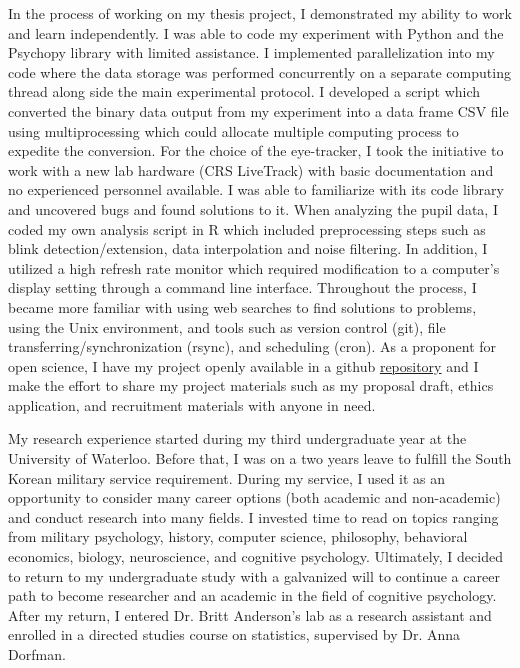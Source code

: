 \documentclass[12pt]{article}
\begin{document}
In the process of working on my thesis project, I demonstrated my ability to work and learn independently. I was able to code my experiment with Python and the Psychopy library with limited assistance. I implemented parallelization into my code where the data storage was performed concurrently on a separate computing thread along side the main experimental protocol. I developed a script which converted the binary data output from my experiment into a data frame CSV file using multiprocessing which could allocate multiple computing process to expedite the conversion. For the choice of the eye-tracker, I took the initiative to work with a new lab hardware (CRS LiveTrack) with basic documentation and no experienced personnel available. I was able to familiarize with its code library and uncovered bugs and found solutions to it. When analyzing the pupil data, I coded my own analysis script in R which included preprocessing steps such as blink detection/extension, data interpolation and noise filtering. In addition, I utilized a high refresh rate monitor which required modification to a computer’s display setting through a command line interface. Throughout the process, I became more familiar with using web searches to find solutions to problems, using the Unix environment, and tools such as version control (git), file transferring/synchronization (rsync), and scheduling (cron). As a proponent for open science, I have my project openly available in a github \href{https://github.com/sjp117/Undergrad_Projects}{repository} and I make the effort to share my project materials such as my proposal draft, ethics application, and recruitment materials with anyone in need.

My research experience started during my third undergraduate year at the University of Waterloo. Before that, I was on a two years leave to fulfill the South Korean military service requirement. During my service, I used it as an opportunity to consider many career options (both academic and non-academic) and conduct research into many fields. I invested time to read on topics ranging from military psychology, history, computer science, philosophy, behavioral economics, biology, neuroscience, and cognitive psychology. Ultimately, I decided to return to my undergraduate study with a galvanized will to continue a career path to become researcher and an academic in the field of cognitive psychology. After my return, I entered Dr. Britt Anderson’s lab as a research assistant and enrolled in a directed studies course on statistics, supervised by Dr. Anna Dorfman.
\end{document}
